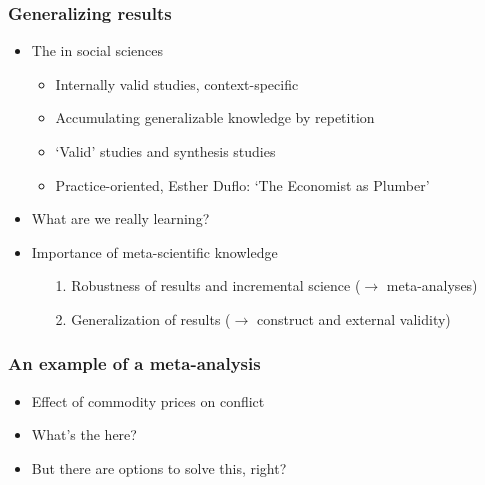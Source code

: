 \documentclass[aspectratio=43]{beamer}
\begin{document}
\begin{frame}
\frametitle{Generalizing results}
\centering

\begin{itemize}
  \item The  in social sciences
  \begin{itemize}
    \item Internally valid studies, context-specific
    \item Accumulating generalizable knowledge by repetition
    \item `Valid' studies and synthesis studies
    \item Practice-oriented, Esther Duflo: `The Economist as Plumber'
  \end{itemize}
  \item What are we really learning? 
  \item[]
  \item<3-> Importance of meta-scientific knowledge
  \begin{itemize}
    \item[1.] Robustness of results and incremental science ($\rightarrow$ meta-analyses)
    \item[2.] Generalization of results ($\rightarrow$ construct and external validity)
  \end{itemize}
\end{itemize}


\end{frame}

\begin{frame}
\frametitle{An example of a meta-analysis}
\centering

\begin{itemize}
  \item Effect of commodity prices on conflict
  \item What's the  here?
  \item<2-> But there are options to solve this, right?
\end{itemize}

\end{frame}
\end{document}
